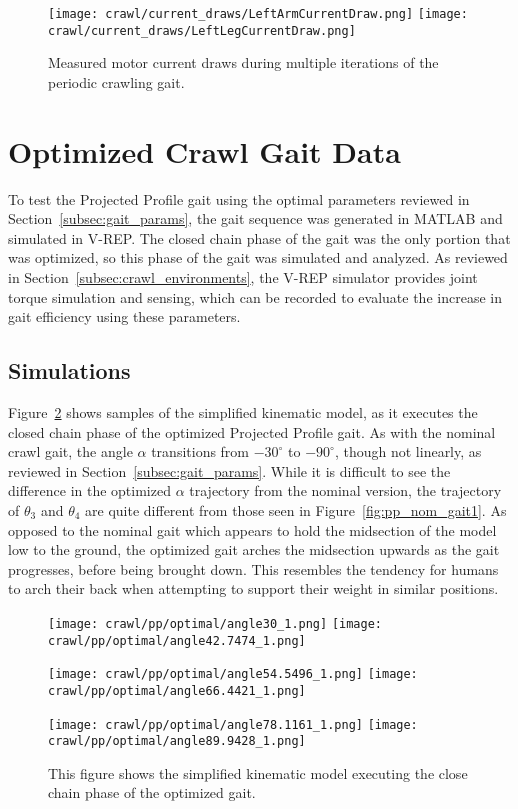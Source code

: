 \begin{figure}
  \centerline{
    \texttt{[image: crawl/current\_draws/LeftArmCurrentDraw.png]}
    \texttt{[image: crawl/current\_draws/LeftLegCurrentDraw.png]}
  }
  \caption{Measured motor current draws during multiple iterations of the periodic crawling gait.}
  \label{fig:nao_currents}
\end{figure}




\FloatBarrier
\section{Optimized Crawl Gait Data} \label{sec:opt_crawl_data}

To test the Projected Profile gait using the optimal parameters reviewed in 
Section~\ref{subsec:gait_params}, the gait sequence was generated in
MATLAB and simulated in V-REP\@. The closed chain phase of the gait was the
only portion that was optimized, so this phase of the gait was simulated and
analyzed. As reviewed in Section~\ref{subsec:crawl_environments}, the V-REP simulator
provides joint torque simulation and sensing, which can be recorded to evaluate
the increase in gait efficiency using these parameters.

\subsection{Simulations}

Figure~\ref{fig:pp_opt_gait1} shows samples of the simplified kinematic model,
as it executes the closed chain phase of the optimized Projected Profile gait.
As with the nominal crawl gait, the angle $\alpha$ transitions from $-30^\circ$ to $-90^\circ$,
though not linearly, as reviewed in Section~\ref{subsec:gait_params}.
While it is difficult to see the difference in the optimized $\alpha$ trajectory from the
nominal version, the trajectory of $\theta_3$ and $\theta_4$ are quite different
from those seen in Figure~\ref{fig:pp_nom_gait1}. As opposed to the nominal gait
which appears to hold the midsection of the model low to the ground, the optimized
gait arches the midsection upwards as the gait progresses, before being brought down. This resembles the tendency for humans to arch their back when attempting
to support their weight in similar positions.

\begin{figure}
  \centerline{
    \texttt{[image: crawl/pp/optimal/angle30\_1.png]}
    \texttt{[image: crawl/pp/optimal/angle42.7474\_1.png]}
  }
  \centerline{
    \texttt{[image: crawl/pp/optimal/angle54.5496\_1.png]}
    \texttt{[image: crawl/pp/optimal/angle66.4421\_1.png]}
  }
  \centerline{
    \texttt{[image: crawl/pp/optimal/angle78.1161\_1.png]}
    \texttt{[image: crawl/pp/optimal/angle89.9428\_1.png]}
  }
  \caption{This figure shows the simplified kinematic model executing the close
           chain phase of the optimized gait.}
  \label{fig:pp_opt_gait1}
\end{figure}

